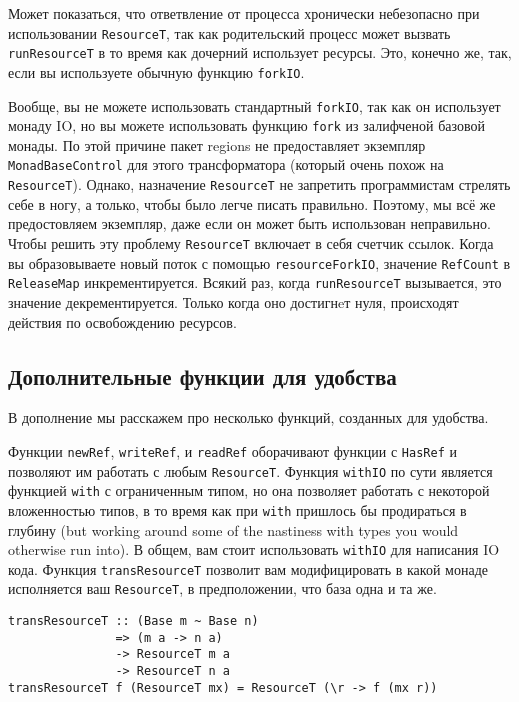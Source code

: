 Может показаться, что ответвление от процесса хронически небезопасно при использовании 
\lstinline'ResourceT', так как родительский процесс может вызвать
\lstinline'runResourceT' в то время
как дочерний использует ресурсы. Это, конечно же, так, если вы используете обычную
функцию \lstinline'forkIO'.

Вообще, вы не можете использовать стандартный \lstinline'forkIO', так как он
использует монаду
IO, но вы можете использовать функцию \lstinline'fork' из залифченой базовой монады.
По этой причине пакет regions не предоставляет экземпляр \lstinline'MonadBaseControl' для
этого
трансформатора (который очень похож на \lstinline'ResourceT'). Однако, назначение
\lstinline'ResourceT'
не запретить программистам стрелять себе в ногу, а только, чтобы было легче писать
правильно. Поэтому, мы всё же предостовляем экземпляр, даже если он может быть
использован неправильно. Чтобы решить эту проблему \lstinline'ResourceT' включает в себя
счетчик ссылок. Когда вы образовываете новый поток с помощью \lstinline'resourceForkIO',
значение \lstinline'RefCount' в \lstinline'ReleaseMap' инкрементируется. Всякий раз, когда
\lstinline'runResourceT'
вызывается, это значение декрементируется. Только когда оно достигнeт нуля, происходят
действия по освобождению ресурсов.
 
\subsection{Дополнительные функции для удобства}

В дополнение мы расскажем про несколько функций, созданных для удобства.
   
Функции \verb=newRef=, \verb=writeRef=, и \verb=readRef= оборачивают
функции с \lstinline'HasRef' и позволяют им работать с любым \lstinline'ResourceT'.
Функция \verb=withIO= по сути является функцией \verb=with= с ограниченным типом, но она 
позволяет работать с некоторой вложенностью типов, в то время как при \verb=with=
пришлось бы продираться в глубину (but working around 
some of the nastiness with types you would otherwise run into). В общем, вам стоит
использовать \lstinline'withIO' для написания IO кода.
Функция \verb=transResourceT= позволит вам модифицировать в какой монаде исполняется ваш
\verb=ResourceT=, в предположении, что база одна и та же.
\begin{lstlisting}
transResourceT :: (Base m ~ Base n)
               => (m a -> n a)
               -> ResourceT m a
               -> ResourceT n a
transResourceT f (ResourceT mx) = ResourceT (\r -> f (mx r))
\end{lstlisting}  

